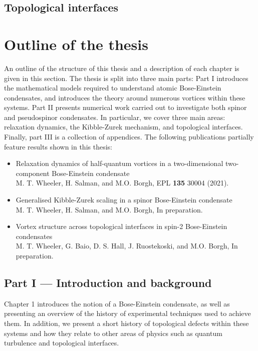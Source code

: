 \subsection{Topological interfaces}

\section{Outline of the thesis}
An outline of the structure of this thesis and a description of each chapter is
given in this section.
The thesis is split into three main parts: Part I introduces the mathematical
models required to understand atomic Bose-Einstein condensates, and introduces
the theory around numerous vortices within these systems.
Part II presents numerical work carried out to investigate both spinor and
pseudospinor condensates.
In particular, we cover three main areas: relaxation dynamics, the Kibble-Zurek
mechanism, and topological interfaces.
Finally, part III is a collection of appendices.
The following publications partially feature results shown in this thesis:
\begin{itemize}
    \item Relaxation dynamics of half-quantum vortices in a two-dimensional
          two-component Bose-Einstein condensate\\
          {\small M. T. Wheeler, H. Salman, and M.O. Borgh, EPL \textbf{135}
          30004 (2021).}
    \item Generalised Kibble-Zurek scaling in a spinor Bose-Einstein
          condensate\\
          {\small M. T. Wheeler, H. Salman, and M.O. Borgh, In preparation.}
    \item Vortex structure across topological interfaces in spin-2 Bose-Einstein
          condensates\\
          {\small M. T. Wheeler, G. Baio, D. S. Hall, J. Ruostekoski, and M.O.
          Borgh, In preparation.}
\end{itemize}

\subsection*{Part I --- Introduction and background}
Chapter 1 introduces the notion of a Bose-Einstein condensate, as well as
presenting an overview of the history of experimental techniques used to achieve
them.
In addition, we present a short history of topological defects within these
systems and how they relate to other areas of physics such as quantum turbulence
and topological interfaces.

